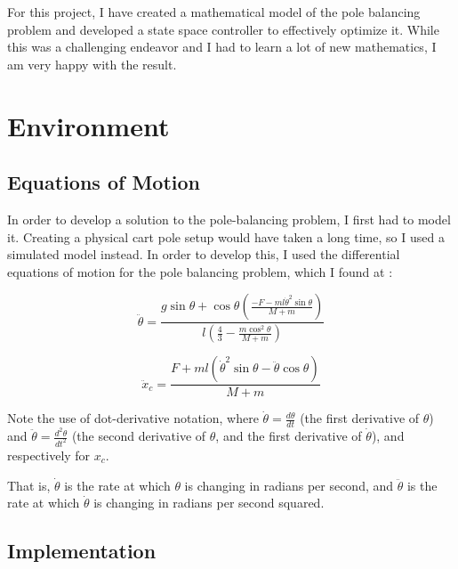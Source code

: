 \documentclass[12pt]{article}
\begin{document}
For this project, I have created a mathematical model of the pole balancing problem and developed a state space controller to effectively optimize it. While this was a challenging endeavor and I had to learn a lot of new mathematics, I am very happy with the result.

\section{Environment}

\subsection{Equations of Motion} \label{equations}

In order to develop a solution to the pole-balancing problem, I first had to model it. Creating a physical cart pole setup would have taken a long time, so I used a simulated model instead. In order to develop this, I used the differential equations of motion for the pole balancing problem, which I found at \cite{polebalancing}:

\begin{equation}
    \ddot \theta = \frac{\displaystyle g \sin \theta + \cos \theta \left( \frac{\displaystyle -F - m l \dot \theta ^2 \sin \theta}{\displaystyle M + m} \right)}{\displaystyle l \left( \frac{\displaystyle 4}{\displaystyle 3} - \frac{\displaystyle m \cos ^2 \theta}{\displaystyle M + m} \right)}
\end{equation}

\begin{equation}
    \ddot x _c = \frac{\displaystyle F + m l \left( \dot \theta ^2 \sin \theta - \ddot \theta \cos \theta \right)}{\displaystyle M + m}
\end{equation}

Note the use of dot-derivative notation, where $\displaystyle \dot \theta = \frac{\displaystyle d \theta}{\displaystyle d t}$ (the first derivative of $\theta$) and $\displaystyle \ddot \theta = \frac{\displaystyle d ^2 \theta}{\displaystyle d t ^2}$ (the second derivative of $\theta$, and the first derivative of $\dot \theta$), and respectively for $x _c$.

That is, $\dot \theta$ is the rate at which $\theta$ is changing in radians per second, and $\ddot \theta$ is the rate at which $\dot \theta$ is changing in radians per second squared.

\subsection{Implementation}
\end{document}
